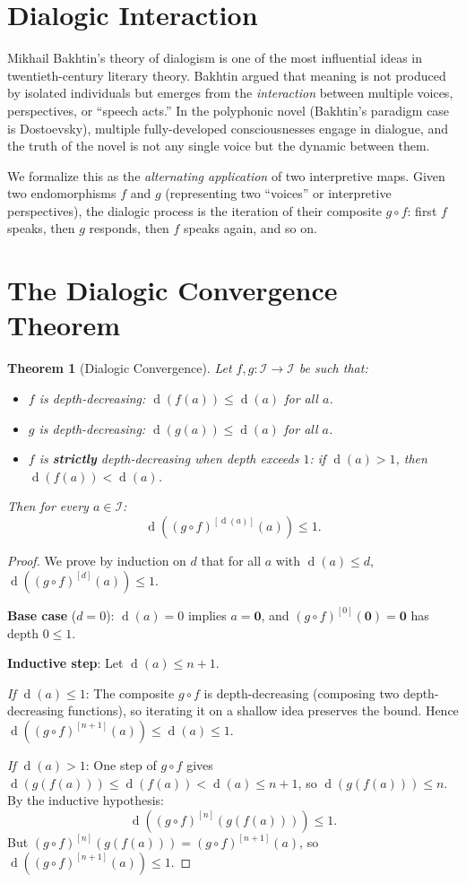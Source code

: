 \documentclass[11pt,openany]{book}
\theoremstyle{definition}
\theoremstyle{plain}
\newtheorem{theorem}[axiom]{Theorem}
\theoremstyle{remark}
\newcommand{\IS}{\mathcal{I}}               %
\newcommand{\void}{\mathbf{0}}              %
\newcommand{\depth}{\operatorname{d}}       %
\begin{document}
\section{Dialogic Interaction}

Mikhail Bakhtin's theory of dialogism is one of the most influential ideas in twentieth-century literary theory. Bakhtin argued that meaning is not produced by isolated individuals but emerges from the \emph{interaction} between multiple voices, perspectives, or ``speech acts.'' In the polyphonic novel (Bakhtin's paradigm case is Dostoevsky), multiple fully-developed consciousnesses engage in dialogue, and the truth of the novel is not any single voice but the dynamic between them.

We formalize this as the \emph{alternating application} of two interpretive maps. Given two endomorphisms $f$ and $g$ (representing two ``voices'' or interpretive perspectives), the dialogic process is the iteration of their composite $g \circ f$: first $f$ speaks, then $g$ responds, then $f$ speaks again, and so on.

\section{The Dialogic Convergence Theorem}

\begin{theorem}[Dialogic Convergence]
\label{thm:dialogic-convergence}
Let $f, g : \IS \to \IS$ be such that:
\begin{itemize}
\item $f$ is depth-decreasing: $\depth(f(a)) \leq \depth(a)$ for all $a$.
\item $g$ is depth-decreasing: $\depth(g(a)) \leq \depth(a)$ for all $a$.
\item $f$ is \textbf{strictly} depth-decreasing when depth exceeds $1$: if $\depth(a) > 1$, then $\depth(f(a)) < \depth(a)$.
\end{itemize}
Then for every $a \in \IS$:
\[
\depth((g \circ f)^{[\depth(a)]}(a)) \leq 1.
\]
\end{theorem}

\begin{proof}
We prove by induction on $d$ that for all $a$ with $\depth(a) \leq d$, $\depth((g \circ f)^{[d]}(a)) \leq 1$.

\textbf{Base case} ($d = 0$): $\depth(a) = 0$ implies $a = \void$, and $(g \circ f)^{[0]}(\void) = \void$ has depth $0 \leq 1$.

\textbf{Inductive step}: Let $\depth(a) \leq n + 1$.

\emph{If $\depth(a) \leq 1$}: The composite $g \circ f$ is depth-decreasing (composing two depth-decreasing functions), so iterating it on a shallow idea preserves the bound. Hence $\depth((g \circ f)^{[n+1]}(a)) \leq \depth(a) \leq 1$.

\emph{If $\depth(a) > 1$}: One step of $g \circ f$ gives $\depth(g(f(a))) \leq \depth(f(a)) < \depth(a) \leq n + 1$, so $\depth(g(f(a))) \leq n$. By the inductive hypothesis:
\[
\depth((g \circ f)^{[n]}(g(f(a)))) \leq 1.
\]
But $(g \circ f)^{[n]}(g(f(a))) = (g \circ f)^{[n+1]}(a)$, so $\depth((g \circ f)^{[n+1]}(a)) \leq 1$.
\end{proof}
\end{document}
